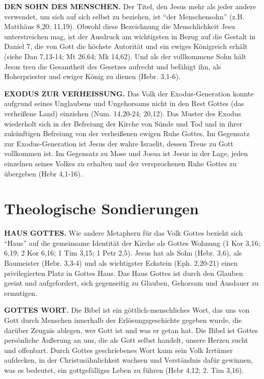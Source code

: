 \documentclass[]{book}
\begin{document}
\textbf{DEN SOHN DES MENSCHEN.} Der Titel, den Jesus mehr als jeder
andere verwendet, um sich auf sich selbst zu beziehen, ist ``der
Menschensohn'' (z.B. Matthäus 8,20; 11,19). Obwohl diese Bezeichnung die
Menschlichkeit Jesu unterstreichen mag, ist der Ausdruck am wichtigsten
in Bezug auf die Gestalt in Daniel 7, die von Gott die höchste Autorität
und ein ewiges Königreich erhält (siehe Dan 7,13-14; Mt 26,64; Mk
14,62). Und als der vollkommene Sohn hält Jesus treu die Gesamtheit des
Gesetzes aufrecht und befähigt ihn, als Hoherpriester und ewiger König
zu dienen (Hebr. 3,1-6).

\textbf{EXODUS ZUR VERHEISSUNG.} Das Volk der Exodus-Generation konnte
aufgrund seines Unglaubens und Ungehorsams nicht in den Rest Gottes (das
verheißene Land) einziehen (Num. 14,20-24; 20,12). Das Muster des Exodus
wiederholt sich in der Befreiung der Kirche von Sünde und Tod und in
ihrer zukünftigen Befreiung von der verheißenen ewigen Ruhe Gottes. Im
Gegensatz zur Exodus-Generation ist Jesus der wahre Israelit, dessen
Treue zu Gott vollkommen ist. Im Gegensatz zu Mose und Josua ist Jesus
in der Lage, jeden einzelnen seines Volkes zu erhalten und der
versprochenen Ruhe Gottes zu übergeben (Hebr 4,1-16).

\section{Theologische Sondierungen}\label{theologische-sondierungen-2}

\textbf{HAUS GOTTES.} Wie andere Metaphern für das Volk Gottes bezieht
sich ``Haus'' auf die gemeinsame Identität der Kirche als Gottes Wohnung
(1 Kor 3,16; 6,19; 2 Kor 6,16; 1 Tim 3,15; 1 Petr 2,5). Jesus hat als
Sohn (Hebr. 3,6), als Baumeister (Hebr. 3,3-4) und als wichtigster
Eckstein (Eph. 2,20-21) einen privilegierten Platz in Gottes Haus. Das
Haus Gottes ist durch den Glauben geeint und aufgefordert, sich
gegenseitig zu Glauben, Gehorsam und Ausdauer zu ermutigen.

\textbf{GOTTES WORT.} Die Bibel ist ein göttlich-menschliches Wort, das
uns von Gott durch Menschen innerhalb der Erlösungsgeschichte gegeben
wurde, die darüber Zeugnis ablegen, wer Gott ist und was er getan hat.
Die Bibel ist Gottes persönliche Äußerung an uns, die als Gott selbst
handelt, unsere Herzen sucht und offenbart. Durch Gottes geschriebenes
Wort kann sein Volk Irrtümer aufdecken, in der Christusähnlichkeit
wachsen und Verständnis dafür gewinnen, was es bedeutet, ein
gottgefälliges Leben zu führen (Hebr 4,12; 2. Tim 3,16).
\end{document}
